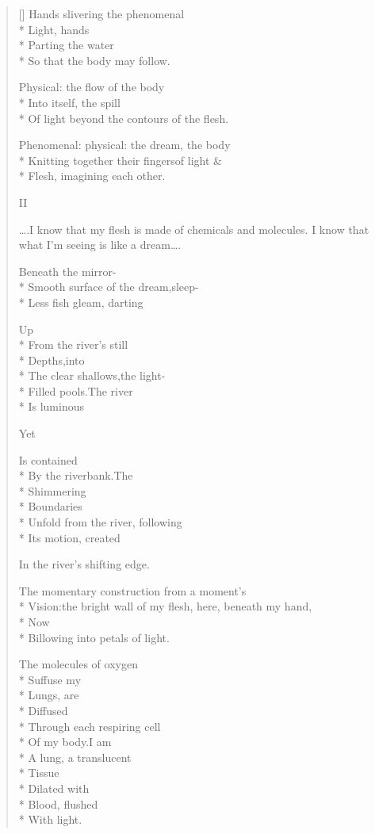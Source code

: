 \begin{verse}[\versewidth]
Hands slivering the phenomenal\\*
Light, hands\\*
Parting the water\\*
So that the body may follow.

Physical: the flow of the body\\*
Into itself, the spill\\*
Of light beyond the contours of the flesh.

Phenomenal:   physical:   the dream, the body\\*
Knitting together their fingers\quad of light \&\\*
Flesh, imagining each other.

\hspace{0.45\versewidth} II

\epigraph{\ldots .I know that my flesh is made of chemicals and molecules. I know that what I'm seeing is like a dream\ldots .}{}

Beneath the mirror-\\*
Smooth surface of the dream,\quad sleep-\\*
Less fish gleam, darting

Up\\*
From the river's still\\*
Depths,\quad into\\*
The clear shallows,\quad the light-\\*
Filled pools.\qquad The river\\*
Is luminous

Yet

Is contained\\*
By the riverbank.\quad The\\*
Shimmering\\*
Boundaries\\*
Unfold from the river, following\\*
Its motion, created

In the river's shifting edge.

\starbreak

The momentary construction from a moment's\\*
Vision:\quad the bright wall of my flesh, here, beneath my hand,\\*
Now\\*
Billowing into petals of light.

\starbreak

The molecules of oxygen\\*
Suffuse my\\*
Lungs, are\\*
Diffused\\*
Through each respiring cell\\*
Of my body.\quad I am\\*
A lung, a translucent\\*
Tissue\\*
Dilated with\\*
Blood, flushed\\*
With light.


\end{verse}
